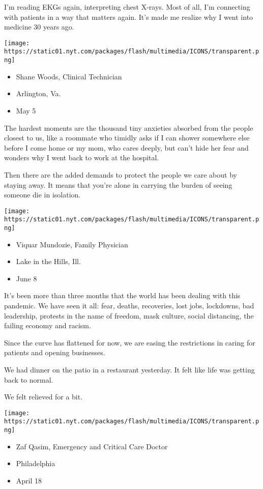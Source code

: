 I'm reading EKGs again, interpreting chest X-rays. Most of all, I'm
connecting with patients in a way that matters again. It's made me
realize why I went into medicine 30 years ago.

\texttt{[image: https://static01.nyt.com/packages/flash/multimedia/ICONS/transparent.png]}

\begin{itemize}
\tightlist
\item
  Shane Woods, Clinical Technician
\item
  Arlington, Va.
\item
  May 5
\end{itemize}

The hardest moments are the thousand tiny anxieties absorbed from the
people closest to us, like a roommate who timidly asks if I can shower
somewhere else before I come home or my mom, who cares deeply, but can't
hide her fear and wonders why I went back to work at the hospital.

Then there are the added demands to protect the people we care about by
staying away. It means that you're alone in carrying the burden of
seeing someone die in isolation.

\texttt{[image: https://static01.nyt.com/packages/flash/multimedia/ICONS/transparent.png]}

\begin{itemize}
\tightlist
\item
  Viquar Mundozie, Family Physician
\item
  Lake in the Hills, Ill.
\item
  June 8
\end{itemize}

It's been more than three months that the world has been dealing with
this pandemic. We have seen it all: fear, deaths, recoveries, lost jobs,
lockdowns, bad leadership, protests in the name of freedom, mask
culture, social distancing, the failing economy and racism.

Since the curve has flattened for now, we are easing the restrictions in
caring for patients and opening businesses.

We had dinner on the patio in a restaurant yesterday. It felt like life
was getting back to normal.

We felt relieved for a bit.

\texttt{[image: https://static01.nyt.com/packages/flash/multimedia/ICONS/transparent.png]}

\begin{itemize}
\tightlist
\item
  Zaf Qasim, Emergency and Critical Care Doctor
\item
  Philadelphia
\item
  April 18
\end{itemize}


